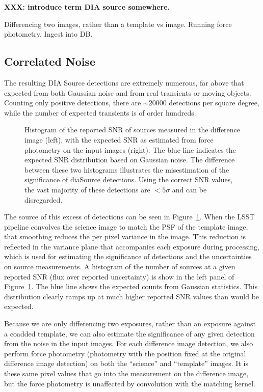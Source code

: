 \textbf{XXX: introduce term DIA source somewhere.}

Differencing two images, rather than a template vs image. Running force
photometry. Ingest into DB.

\subsection{Correlated Noise}

The resulting DIA Source detections are extremely numerous, far above that
expected from both Gaussian noise and from real transients or moving objects.
Counting only positive detections, there are $\sim 20 000$ detections per
square degree, while the number of expected transients is of order hundreds.

\begin{figure}
  \centering
  \caption{
  Histogram of the reported SNR of sources measured in the difference image
  (left), with the expected SNR as estimated from force photometry on the input
  images (right). The blue line indicates the expected SNR distribution based
  on Gaussian noise. The difference between these two histograms illustrates the
  misestimation of the significance of diaSource detections. Using the correct
  SNR values, the vast majority of these detections are $<5 \sigma$ and can be
  disregarded.
  }
  \label{fig:snr_comparison}
\end{figure}

The source of this excess of detections can be seen in
Figure~\ref{fig:snr_comparison}. When the LSST pipeline convolves the science
image to match the PSF of the template image, that smoothing reduces the per
pixel variance in the image. This reduction is reflected in the variance plane
that accompanies each exposure during processing, which is used for estimating
the significance of detections and the uncertainties on source measurements. A
histogram of the number of sources at a given reported SNR (flux over reported
uncertainty) is show in the left panel of Figure~\ref{fig:snr_comparison}. The
blue line shows the expected counts from Gaussian statistics. This distribution
clearly ramps up at much higher reported SNR values than would be expected.

Because we are only differencing two exposures, rather than an exposure against
a coadded template, we can also estimate the significance of any given detection
from the noise in the input images. For each difference image detection, we also
perform force photometry (photometry with the position fixed at the original
difference image detection) on both the ``science'' and ``template'' images. It
is these same pixel values that go into the measurement on the difference image,
but the force photometry is unaffected by convolution with the matching kernel.

